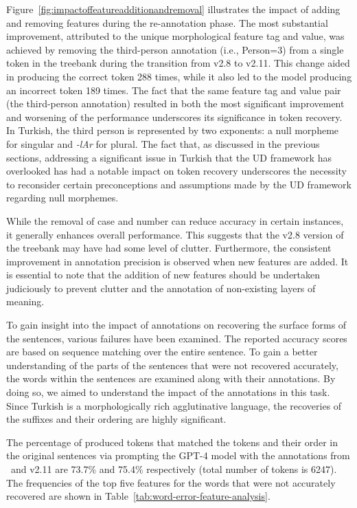 Figure~\ref{fig:impactoffeatureadditionandremoval} illustrates the impact of adding and removing features during the re-annotation phase.
The most substantial improvement, attributed to the unique morphological feature tag and value, was achieved by removing the third-person annotation (i.e., Person=3) from a single token in the treebank during the transition from v2.8 to v2.11.
This change aided in producing the correct token 288 times, while it also led to the model producing an incorrect token 189 times.
The fact that the same feature tag and value pair (the third-person annotation) resulted  in both the most significant improvement and worsening of the performance underscores its significance in token recovery.
In Turkish, the third person is represented by two exponents: a null morpheme for singular and \textit{-lAr} for plural.
The fact that, as discussed in the previous sections, addressing a significant issue in Turkish that the UD framework has overlooked has had a notable impact on token recovery underscores the necessity to reconsider certain preconceptions and assumptions made by the UD framework regarding null morphemes.

While the removal of case and number can reduce accuracy in certain instances, it generally enhances overall performance. This suggests that the v2.8 version of the treebank may have had some level of clutter. Furthermore, the consistent improvement in annotation precision is observed when new features are added. It is essential to note that the addition of new features should be undertaken judiciously to prevent clutter and the annotation of non-existing layers of meaning.

To gain insight into the impact of annotations on recovering the surface forms of the sentences, various failures have been examined.
The reported accuracy scores are based on sequence matching over the entire sentence.
To gain a better understanding of the parts of the sentences that were not recovered accurately, the words within the sentences are examined along with their annotations.
By doing so, we aimed to understand the impact of the annotations in this task.
Since Turkish is a morphologically rich agglutinative language, the recoveries of the suffixes and their ordering are highly significant.

The percentage of produced tokens that matched the tokens and their order in the original sentences via prompting the GPT-4 model with the annotations from \bounvOLD\ and v2.11 are 73.7\%  and 75.4\% respectively (total number of tokens is \num{6247}).
The frequencies of the top five features for the words that were not  accurately recovered are shown in Table~\ref{tab:word-error-feature-analysis}. 

